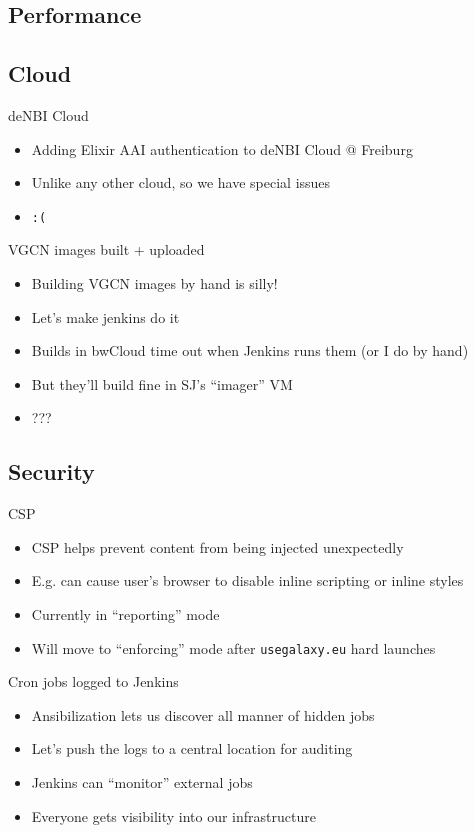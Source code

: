 \documentclass[12pt]{ufrslides}
\begin{document}
\subsection{Performance}
\subsection{Cloud}

	\begin{frame}{deNBI Cloud}
		\begin{itemize}
			\item Adding Elixir AAI authentication to deNBI Cloud @ Freiburg
			\item Unlike any other cloud, so we have special issues
			\item \texttt{:(}
		\end{itemize}
	\end{frame}

	\begin{frame}{VGCN images built + uploaded}
		\begin{itemize}
			\item Building VGCN images by hand is silly!
			\item Let's make jenkins do it
			\item Builds in bwCloud time out when Jenkins runs them (or I do by hand)
			\item But they'll build fine in SJ's ``imager'' VM
			\item ???
		\end{itemize}
	\end{frame}

\subsection{Security}

	\begin{frame}{CSP}
		\begin{itemize}
			\item CSP helps prevent content from being injected unexpectedly
			\item E.g. can cause user's browser to disable inline scripting or inline styles
			\item Currently in ``reporting'' mode
			\item Will move to ``enforcing'' mode after \texttt{usegalaxy.eu} hard launches
		\end{itemize}
	\end{frame}

	\begin{frame}{Cron jobs logged to Jenkins}
		\begin{itemize}
			\item Ansibilization lets us discover all manner of hidden jobs
			\item Let's push the logs to a central location for auditing
			\item Jenkins can ``monitor'' external jobs
			\item Everyone gets visibility into our infrastructure
		\end{itemize}
	\end{frame}
\end{document}
